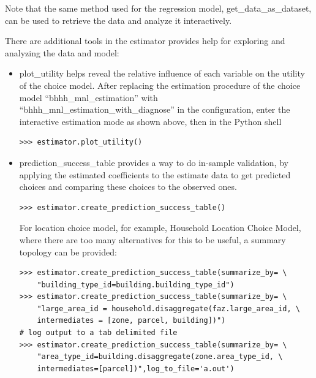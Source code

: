Note that the same method used for the regression model,
get\_data\_as\_dataset, can be used to retrieve the data and
analyze it interactively.

There are additional tools in the estimator provides help
for exploring and analyzing the data and model:
\begin{itemize}
\item plot_utility helps reveal the relative influence of
  each variable on the utility of the choice model. After
  replacing the estimation procedure of the choice model
  ``bhhh_mnl_estimation'' with
  ``bhhh_mnl_estimation_with_diagnose'' in the
  configuration, enter the interactive estimation mode as
  shown above, then in the Python shell
\begin{verbatim}
>>> estimator.plot_utility()
\end{verbatim}
\item prediction_success_table provides a way to do
  in-sample validation, by applying the estimated
  coefficients to the estimate data to get predicted choices
  and comparing these choices to the observed ones.
\begin{verbatim}
>>> estimator.create_prediction_success_table()
\end{verbatim}
  For location choice model, for example, Household Location
  Choice Model, where there are too many alternatives for
  this to be useful, a summary topology can be provided:
\begin{verbatim}
>>> estimator.create_prediction_success_table(summarize_by= \
    "building_type_id=building.building_type_id")
>>> estimator.create_prediction_success_table(summarize_by= \
    "large_area_id = household.disaggregate(faz.large_area_id, \
    intermediates = [zone, parcel, building])")
# log output to a tab delimited file
>>> estimator.create_prediction_success_table(summarize_by= \
    "area_type_id=building.disaggregate(zone.area_type_id, \
    intermediates=[parcel])",log_to_file='a.out')
\end{verbatim}

\end{itemize}